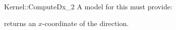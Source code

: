 \begin{ccRefFunctionObjectConcept}{Kernel::ComputeDx_2}
A model for this must provide:



       {returns an $x$-coordinate of the direction.}

\ccRefines
{}



\end{ccRefFunctionObjectConcept}
